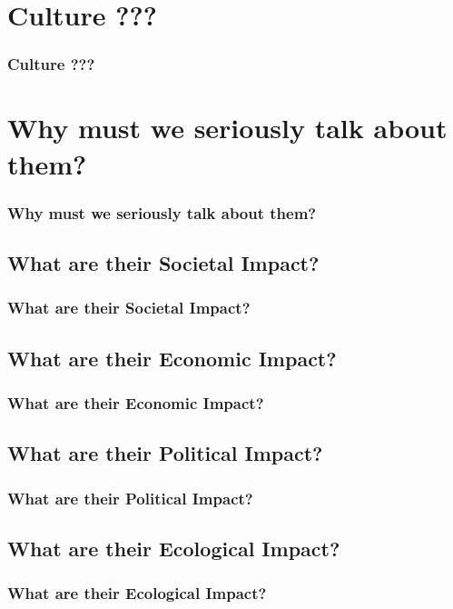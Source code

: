 \documentclass{beamer}
\begin{document}
\section{Culture ???}
\begin{frame}
  \frametitle{Culture ???}
\end{frame}

\section{Why must we seriously talk about them?}
\begin{frame}
  \frametitle{Why must we seriously talk about them?}
\end{frame}

\subsection{What are their Societal Impact?}
\begin{frame}
  \frametitle{What are their Societal Impact?}
\end{frame}

\subsection{What are their Economic Impact?}
\begin{frame}
  \frametitle{What are their Economic Impact?}
\end{frame}

\subsection{What are their Political Impact?}
\begin{frame}
  \frametitle{What are their Political Impact?}
\end{frame}

\subsection{What are their Ecological Impact?}
\begin{frame}
  \frametitle{What are their Ecological Impact?}
\end{frame}
\end{document}
